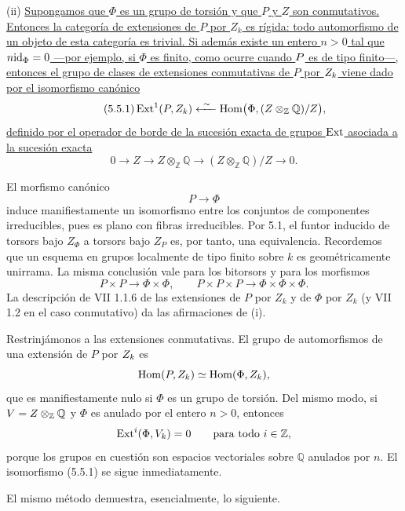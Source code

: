 \smallskip
\noindent (ii) \underline{Supongamos que $\Phi$ es un grupo de torsión
y que $P$ y $Z$ son conmutativos. Entonces la categoría de extensiones
de $P$ por $Z_k$ es rígida: todo automorfismo de un objeto de esta
categoría es trivial. Si además existe un entero $n>0$ tal que
$n\id_\Phi=0$ —por ejemplo, si $\Phi$ es finito, como ocurre cuando
$\sisi{Z}{P}$ es de tipo finito—, entonces el grupo de clases de
extensiones conmutativas de $P$ por $\sisi{G_k}{Z_k}$ viene dado por el
isomorfismo canónico}
\begin{equation}\tag{5.5.1}
 \Ext^1(P,Z_k)
 \xleftarrow{\ \sim\ }
 \Hom\bigl(\Phi,(Z\otimes_{\mathbb Z}\mathbb Q)/Z\bigr),
\end{equation}
\underline{definido por el operador de borde de la sucesión exacta de
grupos $\Ext$ asociada a la sucesión exacta}
\begin{equation}\tag{5.5.2}
 0\longrightarrow Z\longrightarrow Z\otimes_{\mathbb Z}\mathbb Q
 \longrightarrow (Z\otimes_{\mathbb Z}\mathbb Q)/Z
 \longrightarrow0.
\end{equation}


El morfismo canónico
\[
 P\longrightarrow\Phi
\]
induce manifiestamente un isomorfismo entre los conjuntos de
componentes irreducibles, pues es plano con fibras irreducibles. Por
5.1, el funtor inducido de torsors bajo $Z_\Phi$ a torsors bajo $Z_P$
es, por tanto, una equivalencia. Recordemos que un esquema en grupos
localmente de tipo finito sobre $k$ es geométricamente unirrama. La
misma conclusión vale para los bitorsors y para los morfismos
\[
 P\times P\longrightarrow\Phi\times\Phi,
 \qquad
 P\times P\times P\longrightarrow\Phi\times\Phi\times\Phi.
\]
La descripción de VII 1.1.6 de las extensiones de $P$ por $Z_k$ y de
$\Phi$ por $Z_k$ (y VII 1.2 en el caso conmutativo) da las afirmaciones
de (i).

Restrinjámonos a las extensiones conmutativas. El grupo de
automorfismos de una extensión de $P$ por $\sisi{G_k}{Z_k}$ es
\[
 \Hom(P,\sisi{G_k}{Z_k})\simeq
 \Hom(\Phi,\sisi{G_k}{Z_k}),
\]
que es manifiestamente nulo si $\Phi$ es un grupo de torsión. Del mismo
modo, si $V=\sisi{G}{Z}\otimes_{\mathbb Z}\mathbb Q$ y $\Phi$ es
anulado por el entero $n>0$, entonces
\[
 \Ext^i(\Phi,V_k)=0\qquad\text{para todo }i\in\mathbb Z,
\]
porque los grupos en cuestión son espacios vectoriales sobre
$\mathbb Q$ anulados por $n$. El isomorfismo (5.5.1) se sigue
inmediatamente.

El mismo método demuestra, esencialmente, lo siguiente.


